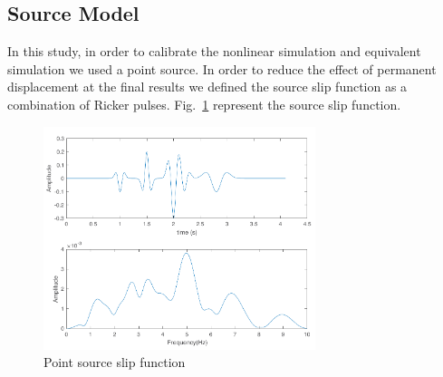 
\subsection{Source Model}

In this study, in order to calibrate the nonlinear simulation and equivalent simulation we used a point source. In order to reduce the effect of permanent displacement at the final results we defined the source slip function as a combination of Ricker pulses. Fig.~\ref{fig:slip_function} represent the source slip function. 

 \begin{figure}
    \centering
    \includegraphics[width=300px]{figures/pdf/slip_function.pdf}
    \caption{Point source slip function}
    \label{fig:slip_function}
\end{figure}






